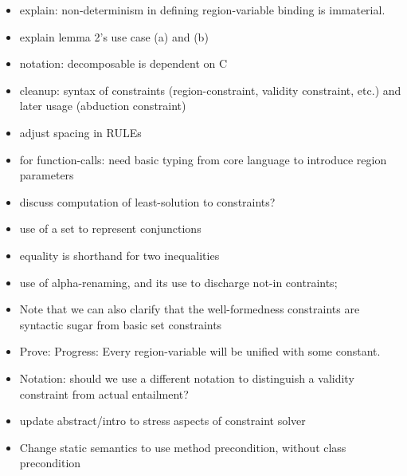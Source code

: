 \begin{itemize}
  \item explain: non-determinism in defining region-variable binding is immaterial.
  \item explain lemma 2's use case (a) and (b)
  \item notation: decomposable is dependent on C
  \item cleanup: syntax of constraints (region-constraint, validity constraint, etc.)
    and later usage (abduction constraint)
  \item adjust spacing in RULEs
  \item for function-calls: need basic typing from core language to introduce region parameters
  \item discuss computation of least-solution to constraints?
  \item use of a set to represent conjunctions
  \item equality is shorthand for two inequalities
  \item use of alpha-renaming, and its use to discharge not-in contraints;
  \item Note that we can also clarify that the well-formedness constraints are
    syntactic sugar from basic set constraints
  \item Prove: Progress: Every region-variable will be unified with some constant.
  \item Notation: should we use a different notation to distinguish a validity constraint
    from actual entailment?
  \item update abstract/intro to stress aspects of constraint solver
  \item Change static semantics to use method precondition, without class precondition
\end{itemize}
